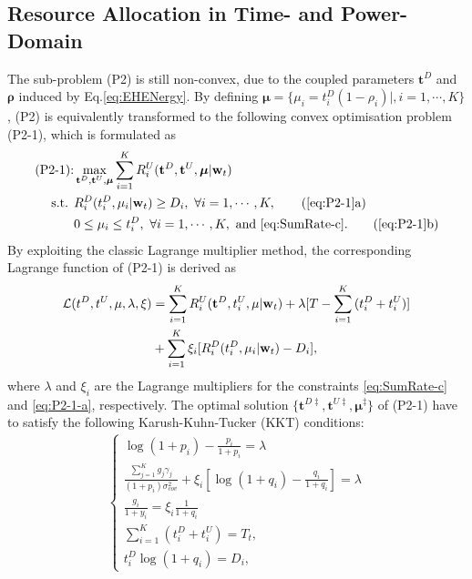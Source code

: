 \documentclass[12pt,draft,onecolumn,journal]{IEEEtran}
\begin{document}
\subsection{Resource Allocation in Time- and Power-Domain}

The sub-problem (P2) is still non-convex, due to the coupled parameters $\mathbf{t}^D$ and $\boldsymbol{\rho}$ induced by Eq.\ref{eq:EHENergy}. By defining $\boldsymbol{\mu} = \{\mu_i = t_i^D(1-\rho_i) | ,i=1,\cdots,K\}$, (P2) is equivalently transformed to the following convex optimisation problem (P2-1), which is formulated as
\begin{align}
	\text{(P2-1):} & \max_{\mathbf{t}^D, \mathbf{t}^U, \boldsymbol{\mu}} \sum_{i=1}^K R_{i}^U (\mathbf{t}^D, \mathbf{t}^U, \boldsymbol{\mu} | \mathbf{w}_t) \label{eq:P2-1}\\
	\text{s.t. }    & R_{i}^D (t_i^D, \mu_i | \mathbf{w}_t) \geq D_i,\ \forall i = 1,\cdots, K, \tag{\ref{eq:P2-1}a} \label{eq:P2-1-a}\\
					& 0\leq \mu_i \leq t_i^D, \ \forall i = 1,\cdots, K, \text{ and \eqref{eq:SumRate-c}}. \tag{\ref{eq:P2-1}b} \label{eq:P2-1-b}
\end{align}
By exploiting the classic Lagrange multiplier method, the corresponding Lagrange function of (P2-1) is derived as
\begin{align}
\mathcal{L}(t^D,t^U,\mu,\lambda,\xi) & = \sum_{i=1}^{K}R_i^U(\mathbf{t}^D,t_i^U,\mathbf{\mu} | \mathbf{w}_t) +\lambda[T-\sum_{i=1}^{K}{(t_i^D+t_i^U)}] \notag \\
& +\sum_{i=1}^{K}\xi_i[R_i^D(t_i^D,\mu_i | \mathbf{w}_t) - D_i],
\end{align}
where $\lambda$ and $\xi_i$ are the Lagrange multipliers for the constraints \eqref{eq:SumRate-c} and \eqref{eq:P2-1-a}, respectively. The optimal solution $\{\mathbf{t}^{D\ddagger}, \mathbf{t}^{U\ddagger}, \boldsymbol{\mu}^{\ddagger}\}$ of (P2-1) have to satisfy the following Karush-Kuhn-Tucker (KKT) conditions:
\begin{align}
	\left\{
	\begin{array}{l}
		\log(1+p_i)-\frac{p_i}{1+p_i}=\lambda \\
 		\frac{\sum_{j = 1}^K g_j\gamma_j}{(1 + p_i)\sigma_{cov}^2}+\xi_i[\log(1+q_i) - \frac{q_i}{1+q_i}]=\lambda \\
		\frac{g_i}{1+y_i} = \xi_i \frac{1}{1+q_i} \\
	    \sum_{i=1}^K(t_i^{D} + t_i^{U}) = T_t, \\
        t_i^{D}\log(1 + q_i) = D_i,
	\end{array}
	\right. \label{eq:Sum-KKT}
\end{align}
\end{document}
